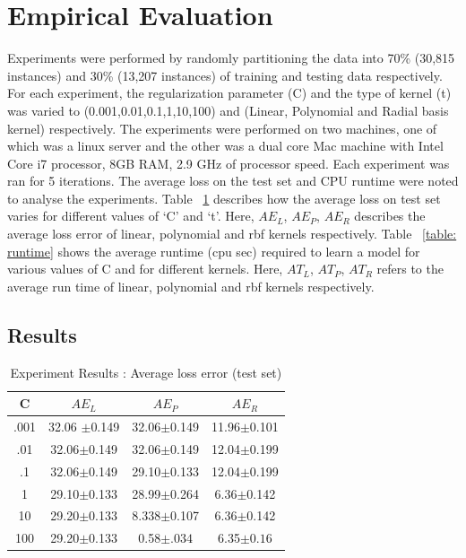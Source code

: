 \documentclass[letterpaper]{article}
\begin{document}
 




\section{Empirical Evaluation}
\label{sec:evaluation}

Experiments were performed by randomly partitioning the data into 70\% (30,815 instances) and 30\% (13,207 instances) of training and testing data respectively. For each experiment, the regularization parameter (C) and the type of kernel (t) was varied to (0.001,0.01,0.1,1,10,100) and (Linear, Polynomial and Radial basis kernel) respectively. The experiments were performed on two machines, one of which was a linux server and the other was a dual core Mac machine with Intel Core i7 processor, 8GB RAM, 2.9 GHz of processor speed. Each experiment was ran for 5 iterations. The average loss on the test set and CPU runtime were noted to analyse the experiments. Table ~\ref{table: error} describes how the average loss on test set varies for different values of `C' and `t'. Here, $AE_{L}$, $AE_{P}$, $AE_{R}$ describes the average loss error of linear, polynomial and rbf kernels respectively. Table ~\ref{table: runtime}  shows the average runtime (cpu sec) required to learn a model for various values of C and for different kernels. Here, $AT_{L}$, $AT_{P}$, $AT_{R}$ refers to the average run time of linear, polynomial and rbf kernels respectively.
 
\subsection{Results}

\begin{table}[htdp]
\begin{center}
\begin{tabular}{| c | c | c | c |}
\hline
C & $AE_{L}$ & $AE_{P}$ & $AE_{R}$ \\
\hline
.001 & 32.06 $\pm$0.149  & 32.06$\pm$0.149 & 11.96$\pm$0.101 \\
.01 & 32.06$\pm$0.149 & 32.06$\pm$0.149 & 12.04$\pm$0.199 \\
.1 & 32.06$\pm$0.149 & 29.10$\pm$0.133  & 12.04$\pm$0.199  \\
1 &29.10$\pm$0.133  & 28.99$\pm$0.264  & 6.36$\pm$0.142  \\
10 & 29.20$\pm$0.133 & 8.338$\pm$0.107 & 6.36$\pm$0.142 \\
100 & 29.20$\pm$0.133 & 0.58$\pm.034$ & 6.35$\pm0.16$  \\
\hline
\end{tabular}
\end{center}
\caption{Experiment Results : Average loss error (test set)}
\label{table: error}
\end{table}
\end{document}
